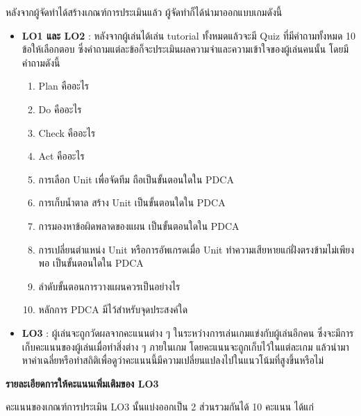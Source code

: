 \documentclass[12pt,oneside,openright,a4paper]{cpe-thai-project}
\begin{document}
หลังจากผู้จัดทำได้สร้างเกณฑ์การประเมินแล้ว ผู้จัดทำก็ได้นำมาออกแบบเกมดังนี้
\begin{itemize}
  \item \textbf{LO1 และ LO2} : หลังจากผู้เล่นได้เล่น tutorial ทั้งหมดแล้วจะมี Quiz ที่มีคำถามทั้งหมด 10 ข้อให้เลือกตอบ 
  ซึ่งคำถามแต่ละข้อก็จะประเมินผลความจำและความเข้าใจของผู้เล่นคนนั้น โดยมีคำถามดังนี้
  \begin{enumerate}
    \item Plan คืออะไร
    \item Do คืออะไร
    \item Check คืออะไร
    \item Act คืออะไร
    \item การเลือก Unit เพื่อจัดทีม ถือเป็นขั้นตอนใดใน PDCA
    \item การเก็บน้ำตาล สร้าง Unit เป็นขั้นตอนใดใน PDCA
    \item การมองหาข้อผิดพลาดของแผน เป็นขั้นตอนใดใน PDCA
    \item การเปลี่ยนตำแหน่ง Unit หรือการอัพเกรดเมื่อ Unit ทำความเสียหายแก่ฝั่งตรงข้ามไม่เพียงพอ เป็นขั้นตอนใดใน PDCA
    \item ลำดับขั้นตอนการวางแผนควรเป็นอย่างไร
    \item หลักการ PDCA มีไว้สำหรับจุดประสงค์ใด
  \end{enumerate}
  
  \item \textbf{LO3} : ผู้เล่นจะถูกวัดผลจากคะแนนต่าง ๆ ในระหว่างการเล่นเกมแข่งกับผู้เล่นอีกคน 
  ซึ่งจะมีการเก็บคะแนนของผู้เล่นเมื่อทำสิ่งต่าง ๆ ภายในเกม โดยคะแนนจะถูกเก็บไว้ในแต่ละเกม 
  แล้วนำมาหาค่าเฉลี่ยหรือทำสถิติเพื่อดูว่าคะแนนนี้มีความเปลี่ยนแปลงไปในแนวโน้มที่สูงขึ้นหรือไม่

\end{itemize}

  \textbf{รายละเอียดการให้คะแนนเพิ่มเติมของ LO3}

  คะแนนของเกณฑ์การประเมิน LO3 นั้นแบ่งออกเป็น 2 ส่วนรวมกันได้ 10 คะแนน ได้แก่
\end{document}
